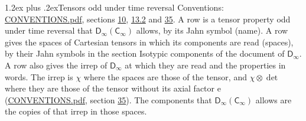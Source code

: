 \documentclass[10pt,a4paper]{article}
\makeatletter
\renewcommand\section{\@startsection{section}{1}{\z@}{-3ex plus -1ex minus -.2ex}%
  {1.2ex plus .2ex}{\normalfont\large\sffamily\bfseries\color{parttitle}}}
\numberwithin{equation}{section}
\newcommand{\grp}[1]{\mathsf{#1}}
\newcommand{\irrprod}{\otimes}
\makeatother
\begin{document}
\section{Tensors odd under time reversal}\label{s:time_odd}
Conventions: \href{../../CONVENTIONS.pdf}{CONVENTIONS.pdf}, sections \href{../../../rotation/CONVENTIONS.pdf\#conv.10}{10}, \href{../../../rotation/CONVENTIONS.pdf\#conv.13.2}{13.2} and \href{../../CONVENTIONS.pdf\#conv.35}{35}.
\leavevmode\label{n:head.name.property}A row is a tensor property odd under time reversal that $\grp{D_{\infty}}(\grp{C_{\infty}})$ allows, by its Jahn symbol (name). \label{n:head.spaces}A row gives the spaces of Cartesian tensors in which its components are read (spaces), by their Jahn symbols in the section Isotypic components of the document of \href{../../../rotation/data/pdf/Dinf.pdf}{$\grp{D_{\infty}}$}. \label{n:head.irrep}\label{n:head.properties}A row also gives the irrep of $\grp{D_{\infty}}$ at which they are read and the properties in words. The irrep is $\chi$ where the spaces are those of the tensor, and $\chi \irrprod \det$ where they are those of the tensor without its axial factor e (\href{../../CONVENTIONS.pdf}{CONVENTIONS.pdf}, section \href{../../CONVENTIONS.pdf\#conv.35}{35}). The components that $\grp{D_{\infty}}(\grp{C_{\infty}})$ allows are the copies of that irrep in those spaces.
\end{document}
